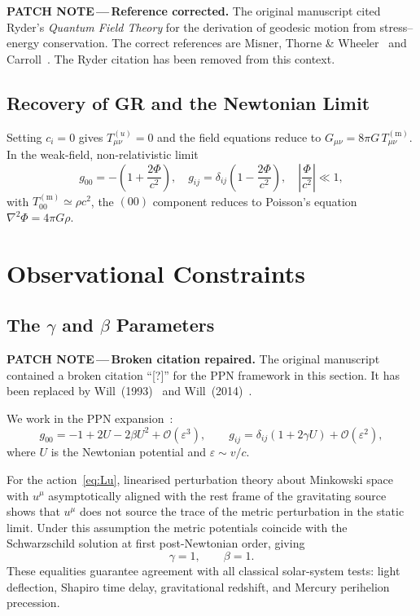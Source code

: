 \documentclass[12pt,a4paper]{article}
\newcommand{\patchnote}[1]{%
  \begin{patchbox}
    {\small\color{patchtext}\textbf{PATCH NOTE\,---\,}#1}
  \end{patchbox}}
\newcommand{\Tmm}{T^{(\mathrm{m})}_{\mu\nu}}
\newcommand{\Tuu}{T^{(u)}_{\mu\nu}}
\begin{document}
\patchnote{\textbf{Reference corrected.}
The original manuscript cited Ryder's \emph{Quantum Field Theory} for the
derivation of geodesic motion from stress--energy conservation. The correct
references are Misner, Thorne \& Wheeler~\citep{misner1973} and
Carroll~\citep{carroll2004}. The Ryder citation has been removed from this
context.}

\subsection{Recovery of GR and the Newtonian Limit}

Setting $c_{i}=0$ gives $\Tuu=0$ and the field equations reduce to
$G_{\mu\nu}=8\pi G\,\Tmm$. In the weak-field, non-relativistic limit
\begin{equation}
  g_{00}=-\!\left(1+\frac{2\Phi}{c^{2}}\right),\quad
  g_{ij}=\delta_{ij}\!\left(1-\frac{2\Phi}{c^{2}}\right),\quad
  \left|\frac{\Phi}{c^{2}}\right|\ll 1,
\end{equation}
with $T^{(\mathrm{m})}_{00}\simeq\rho c^{2}$, the $(00)$ component reduces to
Poisson's equation $\nabla^{2}\Phi=4\pi G\rho$.

\section{Observational Constraints}
\label{sec:obs}

\subsection{The \texorpdfstring{$\gamma$}{gamma} and
            \texorpdfstring{$\beta$}{beta} Parameters}

\patchnote{\textbf{Broken citation repaired.}
The original manuscript contained a broken citation ``[?]'' for the PPN
framework in this section. It has been replaced by
Will~(1993)~\citep{will1993} and Will~(2014)~\citep{will2014}.}

We work in the PPN expansion~\citep{will1993,will2014}:
\begin{equation}
  g_{00}=-1+2U-2\beta U^{2}+\mathcal{O}(\varepsilon^{3}),\qquad
  g_{ij}=\delta_{ij}(1+2\gamma U)+\mathcal{O}(\varepsilon^{2}),
\end{equation}
where $U$ is the Newtonian potential and $\varepsilon\sim v/c$.

For the action~\eqref{eq:Lu}, linearised perturbation theory about Minkowski
space with $u^{\mu}$ asymptotically aligned with the rest frame of the
gravitating source shows that $u^{\mu}$ does not source the trace of the
metric perturbation in the static limit. Under this assumption the metric
potentials coincide with the Schwarzschild solution at first post-Newtonian
order, giving~\citep{foster2006}
\begin{equation}
  \gamma=1,\qquad\beta=1.
  \label{eq:gammabeta}
\end{equation}
These equalities guarantee agreement with all classical solar-system tests:
light deflection, Shapiro time delay, gravitational redshift, and Mercury
perihelion precession.
\end{document}
